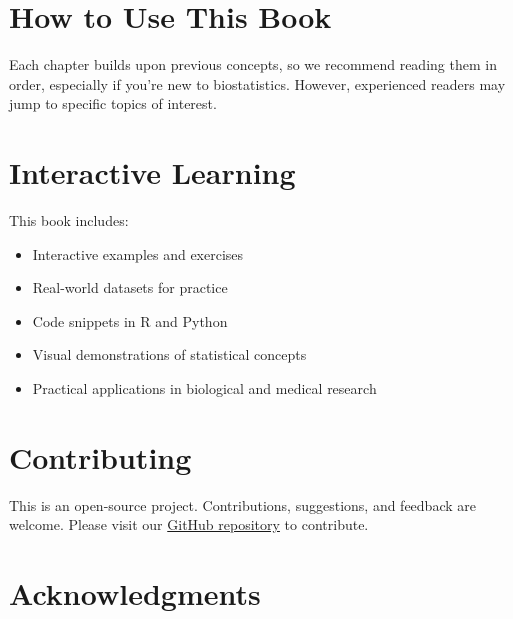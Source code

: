 \documentclass[
  11pt,
  letterpaper,
  oneside]{book}
\providecommand{\tightlist}{%
  \setlength{\itemsep}{0pt}\setlength{\parskip}{0pt}}\usepackage{longtable,booktabs,array}
\begin{document}
\section*{How to Use This Book}\label{how-to-use-this-book}


Each chapter builds upon previous concepts, so we recommend reading them
in order, especially if you're new to biostatistics. However,
experienced readers may jump to specific topics of interest.

\section*{Interactive Learning}\label{interactive-learning}


This book includes:

\begin{itemize}
\tightlist
\item
  Interactive examples and exercises
\item
  Real-world datasets for practice
\item
  Code snippets in R and Python
\item
  Visual demonstrations of statistical concepts
\item
  Practical applications in biological and medical research
\end{itemize}

\section*{Contributing}\label{contributing}


This is an open-source project. Contributions, suggestions, and feedback
are welcome. Please visit our
\href{https://github.com/PawanRamaMali/BioStatica}{GitHub repository} to
contribute.

\section*{Acknowledgments}\label{acknowledgments}

\end{document}
